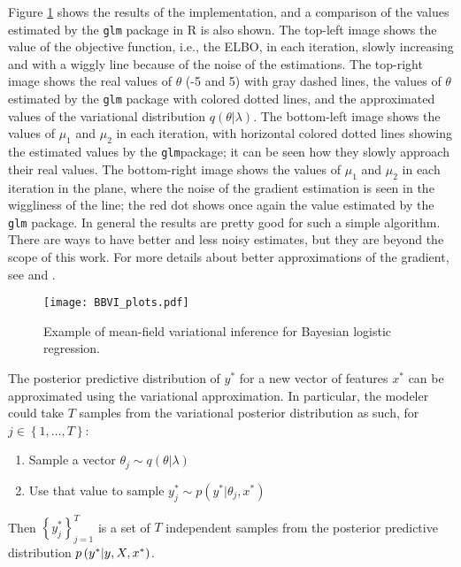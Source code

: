 Figure \ref{fig:BBVI_plots} shows the results of the implementation, and a comparison of the values estimated by the \texttt{glm} package in R is also shown. The top-left image shows the value of the objective function, i.e., the ELBO, in each iteration, slowly increasing and with a wiggly line because of the noise of the estimations. The top-right image shows the real values of $\theta$ (-5 and 5) with gray dashed lines, the values of $\theta$ estimated by the \texttt{glm} package with colored dotted lines, and the approximated values of the variational distribution $q(\theta | \lambda)$. The bottom-left image shows the values of $\mu_1$ and $\mu_2$ in each iteration, with horizontal colored dotted lines showing the estimated values by the \texttt{glm}package; it can be seen how they slowly approach their real values. The bottom-right image shows the values of $\mu_1$ and $\mu_2$ in each iteration in the plane, where the noise of the gradient estimation is seen in the wiggliness of the line; the red dot shows once again the value estimated by the \texttt{glm} package. In general the results are pretty good for such a simple algorithm. There are ways to have better and less noisy estimates, but they are beyond the scope of this work. For more details about better approximations of the gradient, see \cite{kucukelbir2017automatic} and \cite{ranganath2014black}.

\begin{figure}[H]
    \centering
    \texttt{[image: BBVI\_plots.pdf]}
    \caption{Example of mean-field variational inference for Bayesian logistic regression.}
    \label{fig:BBVI_plots}
\end{figure}

The posterior predictive distribution of $y^*$ for a new vector of features $x^*$ can be approximated using the variational approximation. In particular, the modeler could take $T$ samples from the variational posterior distribution as such, for $j \in \left\{ 1, \ldots, T \right\}$:
\begin{enumerate}
  \item Sample a vector $\theta_j \sim q(\theta | \lambda)$
  \item Use that value to sample $y_j^* \sim p(y^* | \theta_j, x^*)$
\end{enumerate}

Then $\left\{ y_j^* \right\}_{j = 1}^T$ is a set of $T$ independent samples from the posterior predictive distribution $p\left( y^* | y, X, x^* \right)$.

